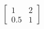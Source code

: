 \documentclass[preview]{standalone}
\begin{document}
\begin{align*}
\begin{bmatrix} 1 & 2 \\ 0.5 & 1 \end{bmatrix}
\end{align*}
\end{document}

